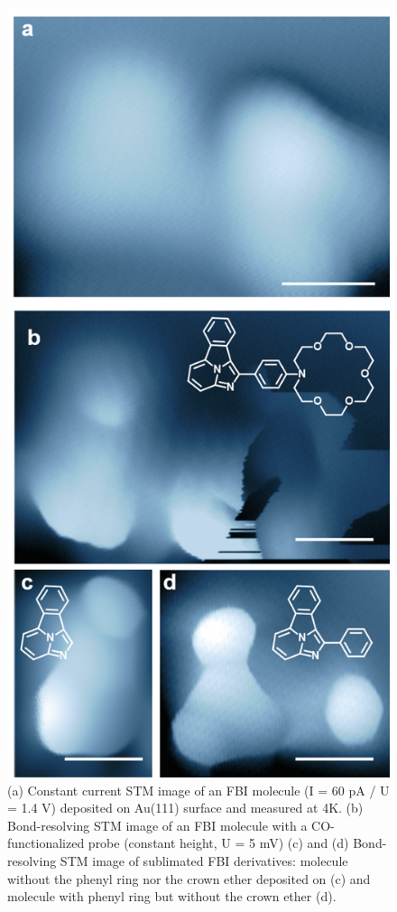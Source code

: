 \documentclass[aps,prl,reprint,longbibliography,superscriptaddress, english]{revtex4-1}
\begin{document}
\begin{figure}[ht!]
	\includegraphics[width=0.9\columnwidth]{figures/Fig_BRSTM.png}
	\caption{\label{FIG_BRSTM.png} 
    (a) Constant current STM image of an FBI molecule (I = 60 pA / U = 1.4 V) deposited on Au(111) surface and measured at 4K. (b) Bond-resolving STM image of an FBI molecule with a CO-functionalized probe (constant height, U = 5 mV) (c) and (d) Bond-resolving STM image of sublimated FBI derivatives: molecule without the phenyl ring nor the crown ether deposited on (c) and molecule  with phenyl ring but without the crown ether (d). }
\end{figure}
\end{document}
